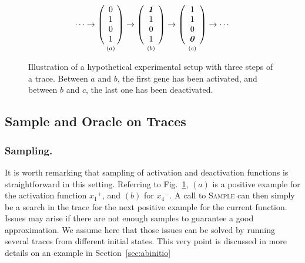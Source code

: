\documentclass{llncs}
\begin{document}
\begin{figure}[htbp]
	{\large 
	\[
	\cdots
	\rightarrow
	\underset{\vspace{1em}(a)}{
		\left(\begin{array}{c}
		0\\ 1\\ 0\\ 1
		\end{array}\right)}
	\rightarrow
	\underset{\vspace{1em}(b)}{
		\left(\begin{array}{c}
		\textbf{\textit{1}}\\ 1\\ 0\\ 1
		\end{array}\right)}
	\rightarrow
	\underset{\vspace{1em}(c)}{
		\left(\begin{array}{c}
		1\\ 1\\ 0\\ \textbf{\textit 0}
		\end{array}\right)}
	\rightarrow
	\cdots
	\]
}
	\caption{\label{steps}Illustration of a hypothetical experimental setup with three steps of a trace. Between $a$ and $b$, the first gene has been activated, and between $b$ and $c$, the last one has been deactivated.}
\end{figure}



\subsection{Sample and Oracle on  Traces}


\subsubsection{Sampling.}

It is worth remarking that sampling of activation and deactivation functions is straightforward in this setting. Referring to Fig.~\ref{steps}, $(a)$ is a positive example for the activation function ${x_1}^+$, and $(b)$ for ${x_4}^-$.
A call to \textsc{Sample} can then simply be a search in the trace for the next positive example for the current function. Issues may arise if there are not enough samples to guarantee a good approximation. 
We assume here that those issues can be solved by running several traces from
different initial states. This very point is discussed in more details on an
example in Section~\ref{sec:abinitio}
\end{document}

